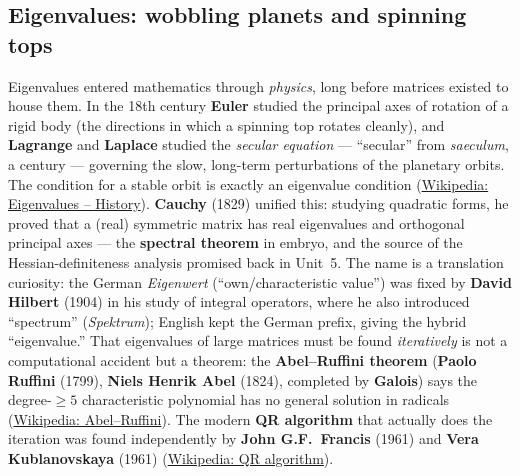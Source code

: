 \documentclass[11pt]{article}
\newcommand{\who}[1]{{\sffamily\bfseries #1}}
\newcommand{\yr}[1]{{\sffamily\color{BrickRed}(#1)}}
\begin{document}
\subsection{Eigenvalues: wobbling planets and spinning tops}
Eigenvalues entered mathematics through \emph{physics}, long before matrices
existed to house them. In the 18th century \who{Euler} studied the principal axes
of rotation of a rigid body (the directions in which a spinning top rotates
cleanly), and \who{Lagrange} and \who{Laplace} studied the \emph{secular equation}
--- ``secular'' from \emph{saeculum}, a century --- governing the slow, long-term
perturbations of the planetary orbits. The condition for a stable orbit is exactly
an eigenvalue condition (\href{https://en.wikipedia.org/wiki/Eigenvalues_and_eigenvectors\#History}{Wikipedia:
Eigenvalues -- History}). \who{Cauchy} \yr{1829} unified this: studying quadratic
forms, he proved that a (real) symmetric matrix has real eigenvalues and
orthogonal principal axes --- the \who{spectral theorem} in embryo, and the source
of the Hessian-definiteness analysis promised back in Unit~5. The name is a
translation curiosity: the German \emph{Eigenwert} (``own/characteristic value'')
was fixed by \who{David Hilbert} \yr{1904} in his study of integral operators,
where he also introduced ``spectrum'' (\emph{Spektrum}); English kept the German
prefix, giving the hybrid ``eigenvalue.'' That eigenvalues of large matrices must
be found \emph{iteratively} is not a computational accident but a theorem: the
\who{Abel--Ruffini theorem} (\who{Paolo Ruffini} \yr{1799}, \who{Niels Henrik
Abel} \yr{1824}, completed by \who{Galois}) says the degree-$\ge 5$ characteristic
polynomial has no general solution in radicals
(\href{https://en.wikipedia.org/wiki/Abel\%E2\%80\%93Ruffini_theorem}{Wikipedia:
Abel--Ruffini}). The modern \who{QR algorithm} that actually does the iteration was
found independently by \who{John G.F.\ Francis} \yr{1961} and \who{Vera
Kublanovskaya} \yr{1961}
(\href{https://en.wikipedia.org/wiki/QR_algorithm\#History}{Wikipedia: QR
algorithm}).
\end{document}
